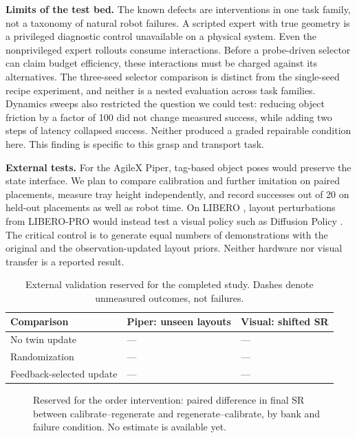 \textbf{Limits of the test bed.} The known defects are interventions in one task family, not a taxonomy of natural robot failures. A scripted expert with true geometry is a privileged diagnostic control unavailable on a physical system. Even the nonprivileged expert rollouts consume interactions. Before a probe-driven selector can claim budget efficiency, these interactions must be charged against its alternatives. The three-seed selector comparison is distinct from the single-seed recipe experiment, and neither is a nested evaluation across task families. Dynamics sweeps also restricted the question we could test: reducing object friction by a factor of 100 did not change measured success, while adding two steps of latency collapsed success. Neither produced a graded repairable condition here. This finding is specific to this grasp and transport task.

\textbf{External tests.} For the AgileX Piper, tag-based object poses would preserve the state interface. We plan to compare calibration and further imitation on paired placements, measure tray height independently, and record successes out of 20 on held-out placements as well as robot time. On LIBERO \cite{libero}, layout perturbations from LIBERO-PRO \cite{liberopro} would instead test a visual policy such as Diffusion Policy \cite{chi2023diffusion}. The critical control is to generate equal numbers of demonstrations with the original and the observation-updated layout priors. Neither hardware nor visual transfer is a reported result.
\begin{table}[t]
\centering\caption{External validation reserved for the completed study. Dashes denote unmeasured outcomes, not failures.}\label{tab:pending}
\begin{tabular}{@{}lll@{}}\toprule
Comparison & Piper: unseen layouts & Visual: shifted SR\\\midrule
No twin update & --- & ---\\
Randomization & --- & ---\\
Feedback-selected update & --- & ---\\\bottomrule
\end{tabular}
\end{table}
\begin{figure}[t]
\centering\fbox{\rule{0pt}{2.5em}\rule{.87\columnwidth}{0pt}}
\caption{Reserved for the order intervention: paired difference in final SR between calibrate--regenerate and regenerate--calibrate, by bank and failure condition. No estimate is available yet.}
\end{figure}
